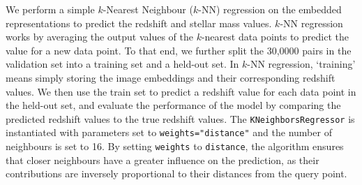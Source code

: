 \documentclass[draft, a4paper,12pt]{article}
\begin{document}
We perform a simple $k$-Nearest Neighbour ($k$-NN) regression on the embedded representations to predict the redshift and stellar mass values. $k$-NN regression works by averaging the output values of the $k$-nearest data points to predict the value for a new data point. To that end, we further split the 30,0000 pairs in the validation set into a training set and a held-out set. In $k$-NN regression, `training' means simply storing the image embeddings and their corresponding redshift values. We then use the train set to predict a redshift value for each data point in the held-out set, and evaluate the performance of the model by comparing the predicted redshift values to the true redshift values. The \verb|KNeighborsRegressor| is instantiated with parameters set to \verb|weights="distance"| and the number of neighbours is set to 16. By setting \verb|weights| to \verb|distance|, the algorithm ensures that closer neighbours have a greater influence on the prediction, as their contributions are inversely proportional to their distances from the query point.



\end{document}
